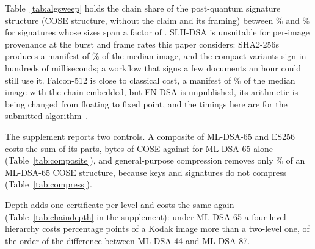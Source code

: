 

Table~\ref{tab:algsweep} holds the chain share of the post-quantum signature
structure (COSE structure, without the claim and its framing) between \NsweepShareLo\% and \NsweepShareHi\% for signatures whose
sizes span a factor of
\NsweepSigFactor. SLH-DSA is unsuitable for per-image provenance at the
burst and frame rates this paper considers: SHA2-256s produces a manifest of
\NslhBigPct\% of the median image, and the compact variants sign in hundreds
of milliseconds; a workflow that signs a few documents an hour could still
use it. Falcon-512 is close to classical cost, a manifest of \NfalconEmbPct\%
of the median image with the chain embedded, but FN-DSA is unpublished, its
arithmetic is being changed from floating to fixed point, and the timings here
are for the submitted algorithm~\cite{nist_fips206_status,nist_fips206_plan}.

The supplement reports two controls. A composite of ML-DSA-65 and ES256 costs
the sum of its parts, \NcompositeCose{} bytes of COSE against
\NcoseDSAsixtyfive{} for ML-DSA-65 alone (Table~\ref{tab:composite}), and
general-purpose compression removes only \NcompressDSAsixtyfive\% of an
ML-DSA-65 COSE structure, because keys and signatures do not compress
(Table~\ref{tab:compress}).

Depth adds one certificate per level and costs the same again
(Table~\ref{tab:chaindepth} in the supplement): under ML-DSA-65 a four-level
hierarchy costs \NdepthSpread{} percentage points of a Kodak image more than a
two-level one, of the order of the difference between ML-DSA-44 and
ML-DSA-87.
